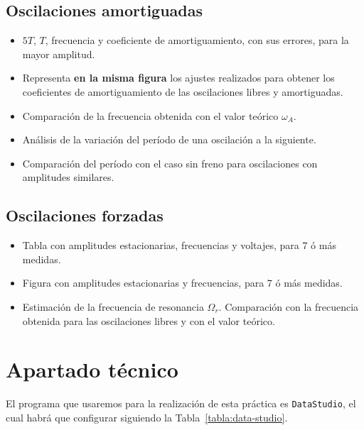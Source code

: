 \documentclass[11pt]{articulo}
\begin{document}
\subsection*{Oscilaciones amortiguadas}

\begin{itemize}

\item{$5T$, $T$, frecuencia y coeficiente de amortiguamiento, con sus errores, para la mayor amplitud.}
\item{Representa {\bf en la misma figura} los ajustes realizados para obtener los coeficientes de amortiguamiento de las oscilaciones libres y amortiguadas.}
\item{Comparaci\'on de la frecuencia obtenida con el valor te\'orico $\omega_A$.}
\item{An\'alisis de la variaci\'on del per\'iodo de una oscilaci\'on a la siguiente.}
\item{Comparaci\'on del per\'iodo con el caso sin freno para oscilaciones con amplitudes similares.}

\end{itemize}

\subsection*{Oscilaciones forzadas}

\begin{itemize}

\item{Tabla con amplitudes estacionarias, frecuencias y voltajes, para 7 \'o m\'as medidas.}
\item{Figura con amplitudes estacionarias y frecuencias, para 7 \'o m\'as medidas.}
\item{Estimaci\'on de la frecuencia de resonancia $\Omega_r$. Comparaci\'on con la frecuencia obtenida para las oscilaciones libres y con el valor te\'orico.}

\end{itemize}


\section*{Apartado t\'ecnico}

El programa que usaremos para la realizaci\'on de esta pr\'actica es {\tt DataStudio}, el cual habr\'a que configurar siguiendo la Tabla~\ref{tabla:data-studio}.
\end{document}

